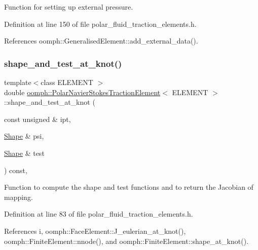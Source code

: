 Function for setting up external pressure. 



Definition at line 150 of file polar\+\_\+fluid\+\_\+traction\+\_\+elements.\+h.



References oomph\+::\+Generalised\+Element\+::add\+\_\+external\+\_\+data().

\mbox{\label{classoomph_1_1PolarNavierStokesTractionElement_aa4c33668b9cf2a9c38cc10c72466f32d}} 
\subsubsection{\texorpdfstring{shape\+\_\+and\+\_\+test\+\_\+at\+\_\+knot()}{shape\_and\_test\_at\_knot()}}
{\footnotesize\ttfamily template$<$class E\+L\+E\+M\+E\+NT $>$ \\
double \hyperlink{classoomph_1_1PolarNavierStokesTractionElement}{oomph\+::\+Polar\+Navier\+Stokes\+Traction\+Element}$<$ E\+L\+E\+M\+E\+NT $>$\+::shape\+\_\+and\+\_\+test\+\_\+at\+\_\+knot (\begin{DoxyParamCaption}\item[{const unsigned \&}]{ipt,  }\item[{\hyperlink{classoomph_1_1Shape}{Shape} \&}]{psi,  }\item[{\hyperlink{classoomph_1_1Shape}{Shape} \&}]{test }\end{DoxyParamCaption}) const\hspace{0.3cm}{\ttfamily [inline]}, {\ttfamily [protected]}}



Function to compute the shape and test functions and to return the Jacobian of mapping. 



Definition at line 83 of file polar\+\_\+fluid\+\_\+traction\+\_\+elements.\+h.



References i, oomph\+::\+Face\+Element\+::\+J\+\_\+eulerian\+\_\+at\+\_\+knot(), oomph\+::\+Finite\+Element\+::nnode(), and oomph\+::\+Finite\+Element\+::shape\+\_\+at\+\_\+knot().




